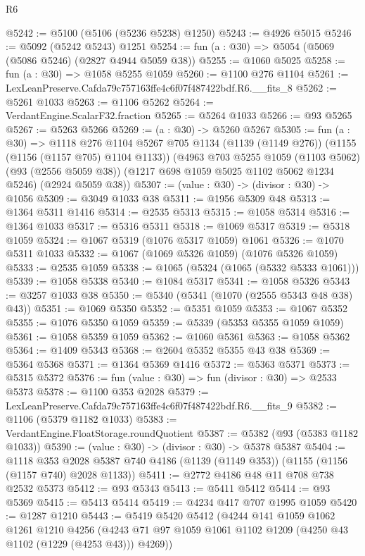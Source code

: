 \begin{lexlean}{R6}
\begin{coremodule}
@5242 := @5100 (@5106 (@5236 @5238) @1250)
@5243 := @4926 @5015
@5246 := @5092 (@5242 @5243) @1251
@5254 := fun (a : @30) => @5054 (@5069 (@5086 @5246) (@2827 @4944 @5059 @38))
@5255 := @1060 @5025
@5258 := fun (a : @30) => @1058 @5255 @1059
@5260 := @1100 @276 @1104
@5261 := LexLeanPreserve.Cafda79c757163ffe4c6f07f487422bdf.R6.__fits_8
@5262 := @5261 @1033
@5263 := @1106 @5262
@5264 := VerdantEngine.ScalarF32.fraction
@5265 := @5264 @1033
@5266 := @93 @5265
@5267 := @5263 @5266
@5269 := (a : @30) -> @5260 @5267
@5305 := fun (a : @30) =>
  @1118
    @276
    @1104
    @5267
    @705
    @1134
    (@1139 (@1149 @276))
    (@1155 (@1156 (@1157 @705) @1104 @1133))
    (@4963
      @703
      @5255
      @1059
      (@1103 @5062)
      (@93 (@2556 @5059 @38))
      (@1217 @698 @1059 @5025 @1102 @5062 @1234 @5246)
      (@2924 @5059 @38))
@5307 := (value : @30) -> (divisor : @30) -> @1056
@5309 := @3049 @1033 @38
@5311 := @1956 @5309 @48
@5313 := @1364 @5311 @1416
@5314 := @2535 @5313
@5315 := @1058 @5314
@5316 := @1364 @1033
@5317 := @5316 @5311
@5318 := @1069 @5317
@5319 := @5318 @1059
@5324 := @1067 @5319 (@1076 @5317 @1059) @1061
@5326 := @1070 @5311 @1033
@5332 := @1067 (@1069 @5326 @1059) (@1076 @5326 @1059)
@5333 := @2535 @1059
@5338 := @1065 (@5324 (@1065 (@5332 @5333 @1061)))
@5339 := @1058 @5338
@5340 := @1084 @5317
@5341 := @1058 @5326
@5343 := @3257 @1033 @38
@5350 := @5340 (@5341 (@1070 (@2555 @5343 @48 @38) @43))
@5351 := @1069 @5350
@5352 := @5351 @1059
@5353 := @1067 @5352
@5355 := @1076 @5350 @1059
@5359 := @5339 (@5353 @5355 @1059 @1059)
@5361 := @1058 @5359 @1059
@5362 := @1060 @5361
@5363 := @1058 @5362
@5364 := @1409 @5343
@5368 := @2604 @5352 @5355 @43 @38
@5369 := @5364 @5368
@5371 := @1364 @5369 @1416
@5372 := @5363 @5371
@5373 := @5315 @5372
@5376 := fun (value : @30) => fun (divisor : @30) => @2533 @5373
@5378 := @1100 @353 @2028
@5379 := LexLeanPreserve.Cafda79c757163ffe4c6f07f487422bdf.R6.__fits_9
@5382 := @1106 (@5379 @1182 @1033)
@5383 := VerdantEngine.FloatStorage.roundQuotient
@5387 := @5382 (@93 (@5383 @1182 @1033))
@5390 := (value : @30) -> (divisor : @30) -> @5378 @5387
@5404 := @1118
    @353
    @2028
    @5387
    @740
    @4186
    (@1139 (@1149 @353))
    (@1155 (@1156 (@1157 @740) @2028 @1133))
@5411 := @2772 @4186 @48 @11 @708 @738 @2532 @5373
@5412 := @93 @5343
@5413 := @5411 @5412
@5414 := @93 @5369
@5415 := @5413 @5414
@5419 := @4234 @417 @707 @1995 @1059
@5420 := @1287 @1210
@5443 := @5419
    @5420
    @5412
    (@4244
      @141
      @1059
      @1062
      @1261
      @1210
      @4256
      (@4243 @71 @97 @1059 @1061 @1102 @1209 (@4250 @43 @1102 (@1229 (@4253 @43))) @4269))

\end{coremodule}
\end{lexlean}
